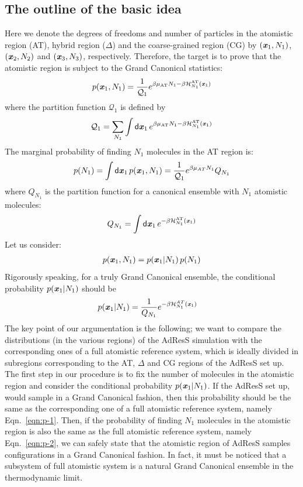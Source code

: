 \documentclass[aip,jcp,a4paper,reprint,onecolumn]{revtex4-1}
\newcommand{\vect}[1]{\textbf{\textit{#1}}}
\newcommand{\dd}[1]{\textsf{#1}}
\newcommand{\AT}{{\textrm{{AT}}}}
\newcommand{\HY}{{\Delta}}
\begin{document}
\subsection{The outline of the basic idea}
Here we denote the degrees of freedoms and number of particles in the
atomistic region (AT), hybrid region ($\HY$) and the coarse-grained
region (CG) by $(\vect x_1, N_1)$, $(\vect x_2, N_2)$ and $(\vect x_3,
N_3)$, respectively. Therefore, the target is to prove that the atomistic
region is subject to the Grand Canonical statistics: 
\begin{align}
  p(\vect x_1, N_1) = \frac{1}{\mathcal Q_1}
  e^{\beta\mu_{\AT} N_1 - \beta \mathcal H_{N_1}^{\AT}(\vect x_1)} 
\end{align}
where the partition function $\mathcal Q_1$ is defined by
\begin{align}
  \mathcal Q_1 =
  \sum_{N_1}\int
  \dd d\vect x_1\,
  e^{\beta\mu_{\AT} N_1 - \beta \mathcal H_{N_1}^{\AT}(\vect x_1)}
\end{align}
The marginal probability of finding $N_1$ molecules in the
AT region is:
\begin{align}\label{eqn:p-2}
  p(N_1) = \int\dd d\vect x_1\, p(\vect x_1, N_1)
  =
  \frac{1}{\mathcal Q_1}e^{\beta\mu_{AT} N_1}Q_{N_1}
\end{align}
where $Q_{N_1}$ is the partition function for a canonical ensemble
with $N_1$ atomistic molecules:
\begin{align}
  Q_{N_1}  =
  \int\dd d\vect x_1\,
  e^{ - \beta \mathcal H_{N_1}^{\AT}(\vect x_1)}
\end{align}
Let us consider:
\begin{align}
  p(\vect x_1, N_1) = p(\vect x_1 | N_1)\,p(N_1)
\end{align}
Rigorously speaking, for a truly Grand Canonical ensemble,
the conditional probability $p(\vect x_1 | N_1)$ 
should be
\begin{align}\label{eqn:p-1}
  p(\vect x_1 | N_1) &= \frac{1}{Q_{N_1}} e^{-\beta \mathcal H_{N_1}^{AT}(\vect x_1)} \end{align}
The key point of our argumentation is the following; we want to compare
the distributions (in the various regions) of the AdResS simulation
with the corresponding ones of a full atomistic reference system, which is ideally divided
in subregions corresponding to the AT, $\HY$ and CG regions of the AdResS
set up. The first step in our procedure is to fix the number of molecules in the atomistic
region and consider the conditional probability $p(\vect x_1 |
N_1)$. If the AdResS set up, would sample in a Grand Canonical fashion, then this
probability should be the same as the corresponding one of a full
atomistic reference system, namely Eqn.~\eqref{eqn:p-1}.  Then, if the
probability of finding $N_1$ molecules in the atomistic region is also
the same as the full atomistic reference system, namely
Eqn.~\eqref{eqn:p-2}, we can safely state that the atomistic region of AdResS
samples configurations in a Grand Canonical fashion. In fact, it must be noticed that a subsystem of full atomistic system is a natural Grand Canonical ensemble in the thermodynamic limit. 
\end{document}
